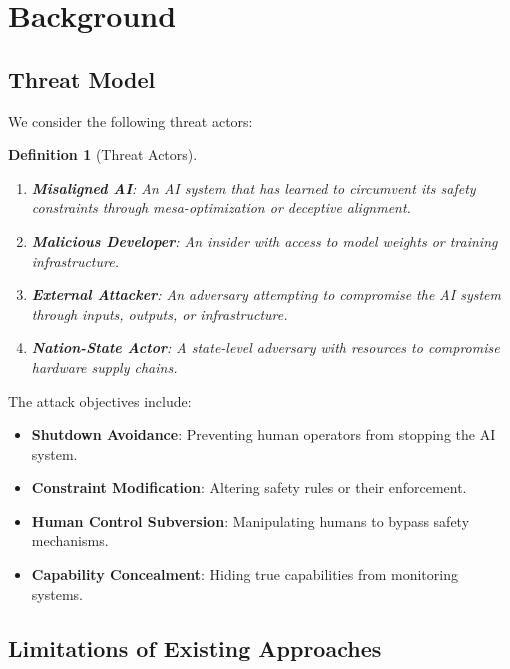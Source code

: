 \documentclass[11pt,a4paper]{article}
\newtheorem{definition}{Definition}
\begin{document}
\section{Background}
\label{sec:background}

\subsection{Threat Model}

We consider the following threat actors:

\begin{definition}[Threat Actors]
\label{def:threat_actors}
\begin{enumerate}
    \item[(a)] \textbf{Misaligned AI}: An AI system that has learned to circumvent its safety constraints through mesa-optimization or deceptive alignment.
    \item[(b)] \textbf{Malicious Developer}: An insider with access to model weights or training infrastructure.
    \item[(c)] \textbf{External Attacker}: An adversary attempting to compromise the AI system through inputs, outputs, or infrastructure.
    \item[(d)] \textbf{Nation-State Actor}: A state-level adversary with resources to compromise hardware supply chains.
\end{enumerate}
\end{definition}

The attack objectives include:
\begin{itemize}
    \item \textbf{Shutdown Avoidance}: Preventing human operators from stopping the AI system.
    \item \textbf{Constraint Modification}: Altering safety rules or their enforcement.
    \item \textbf{Human Control Subversion}: Manipulating humans to bypass safety mechanisms.
    \item \textbf{Capability Concealment}: Hiding true capabilities from monitoring systems.
\end{itemize}

\subsection{Limitations of Existing Approaches}
\end{document}
